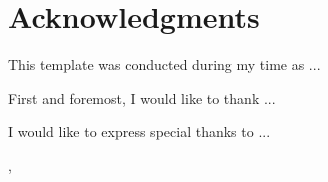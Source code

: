 
\chapter*{Acknowledgments}
This template was conducted during my time as ...

First and foremost, I would like to thank ...

I would like to express special thanks to ...

\vspace{0.5in}
\begin{flushright}
  \metaCity, \metaDate
\end{flushright}
